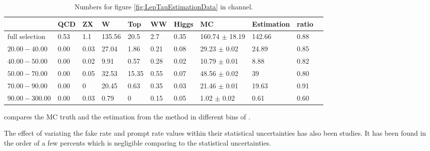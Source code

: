 \begin{table}[!Hhtb]
\begin{center}
\begin{tabular}{lllllllllll}
\hline
\hline
               &  QCD     &  ZX     &  W     & Top      & WW      & Higgs     & MC                 &  Estimation &ratio        &      \\             
\hline
\hline
full selection & 0.53     & 1.1     & 135.56 & 20.5     & 2.7     & 0.35       & 160.74 $\pm$ 18.19 & 142.66    &  0.88 \\
$20.00-40.00$  & 0.00     & 0.03    & 27.04  & 1.86     & 0.21    & 0.08       & 29.23 $\pm$ 0.02   & 24.89     &  0.85 \\
$40.00-50.00$  & 0.00     & 0.02    & 9.91   & 0.57     & 0.28    & 0.02       & 10.79 $\pm$ 0.01   & 8.88      &  0.82 \\
$50.00-70.00$  & 0.00     & 0.05    & 32.53  & 15.35    & 0.55    & 0.07       & 48.56 $\pm$ 0.02   & 39        &  0.80 \\
$70.00-90.00$  & 0.00     & 0       & 20.45  & 0.63     & 0.35    & 0.03       & 21.46 $\pm$ 0.01   & 19.63     &  0.91 \\
$90.00-300.00$ & 0.00     & 0.03    & 0.79   & 0        & 0.15    & 0.05       & 1.02 $\pm$ 0.02    & 0.61      &   0.60\\
\hline
\hline
\end{tabular}
\caption{Numbers for figure \ref{fig:LepTauEstimationData} in \muTau channel.}
\label{tbl:LepTauEstimationData}
\end{center}
\end{table}
compares the MC truth and the estimation from the method in different bins of \mttwo.

The effect of variating the fake rate and prompt rate values within their statistical uncertainties has also been studies. It has been found in the order of a few percents which is negligible comparing to the statistical uncertainties.
